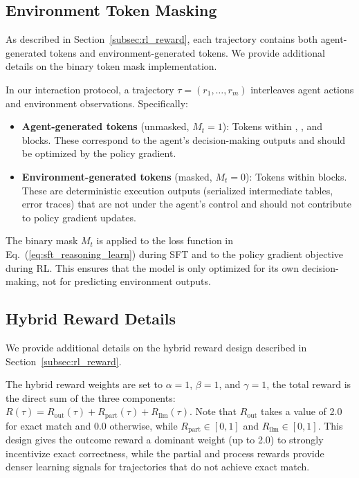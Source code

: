 \subsection{Environment Token Masking}
\label{subsec:appendix_token_masking}

As described in Section~\ref{subsec:rl_reward}, each trajectory contains both agent-generated tokens and environment-generated tokens. We provide additional details on the binary token mask implementation.

In our interaction protocol, a trajectory $\tau = (r_1, \dots, r_m)$ interleaves agent actions and environment observations. Specifically:
\begin{itemize}[leftmargin=*]
    \item \textbf{Agent-generated tokens} (unmasked, $M_t = 1$): Tokens within , , and  blocks. These correspond to the agent's decision-making outputs and should be optimized by the policy gradient.
    \item \textbf{Environment-generated tokens} (masked, $M_t = 0$): Tokens within  blocks. These are deterministic execution outputs (\eg serialized intermediate tables, error traces) that are not under the agent's control and should not contribute to policy gradient updates.
\end{itemize}

The binary mask $M_t$ is applied to the loss function in Eq.~(\ref{eq:sft_reasoning_learn}) during SFT and to the policy gradient objective during RL. This ensures that the model is only optimized for its own decision-making, not for predicting environment outputs.

\subsection{Hybrid Reward Details}
\label{subsec:appendix_hybrid_reward}

We provide additional details on the hybrid reward design described in Section~\ref{subsec:rl_reward}.

The hybrid reward weights are set to $\alpha = 1$, $\beta = 1$, and $\gamma = 1$, \ie the total reward is the direct sum of the three components: $R(\tau) = R_{\text{out}}(\tau) + R_{\text{part}}(\tau) + R_{\text{llm}}(\tau)$. Note that $R_{\text{out}}$ takes a value of 2.0 for exact match and 0.0 otherwise, while $R_{\text{part}} \in [0, 1]$ and $R_{\text{llm}} \in [0, 1]$. This design gives the outcome reward a dominant weight (up to 2.0) to strongly incentivize exact correctness, while the partial and process rewards provide denser learning signals for trajectories that do not achieve exact match.

